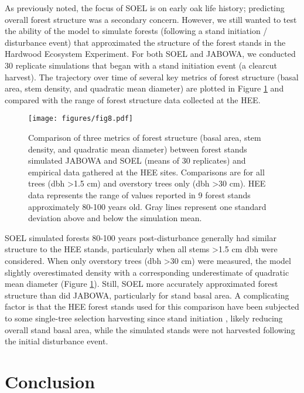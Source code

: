 \documentclass[
11pt, %
a4paper, %
oneside, %
headinclude,footinclude, %
]{scrartcl}
\begin{document}
As previously noted, the focus of SOEL is on early oak life history; predicting overall forest structure was a secondary concern. However, we still wanted to test the ability of the model to simulate forests (following a stand initiation / disturbance event) that approximated the structure of the forest stands in the Hardwood Ecosystem Experiment. For both SOEL and JABOWA, we conducted 30 replicate simulations that began with a stand initiation event (a clearcut harvest). The trajectory over time of several key metrics of forest structure (basal area, stem density, and quadratic mean diameter) are plotted in Figure \ref{fig:8} and compared with the range of forest structure data collected at the HEE.

\begin{figure}
	\centering
	\texttt{[image: figures/fig8.pdf]}
	\caption{Comparison of three metrics of forest structure (basal area, stem density, and quadratic mean diameter) between forest stands simulated JABOWA and SOEL (means of 30 replicates) and empirical data gathered at the HEE sites. Comparisons are for all trees (dbh \textgreater 1.5 cm) and overstory trees only (dbh \textgreater 30 cm). HEE data represents the range of values reported in 9 forest stands approximately 80-100 years old. Gray lines represent one standard deviation above and below the simulation mean.}
	\label{fig:8}
\end{figure}

SOEL simulated forests 80-100 years post-disturbance generally had similar structure to the HEE stands, particularly when all stems \textgreater 1.5 cm dbh were considered. When only overstory trees (dbh \textgreater 30 cm) were measured, the model slightly overestimated density with a corresponding underestimate of quadratic mean diameter (Figure \ref{fig:8}). Still, SOEL more accurately approximated forest structure than did JABOWA, particularly for stand basal area. A complicating factor is that the HEE forest stands used for this comparison have been subjected to some single-tree selection harvesting since stand initiation \citep{Carman2013}, likely reducing overall stand basal area, while the simulated stands were not harvested following the initial disturbance event.

\section{Conclusion}
\end{document}
